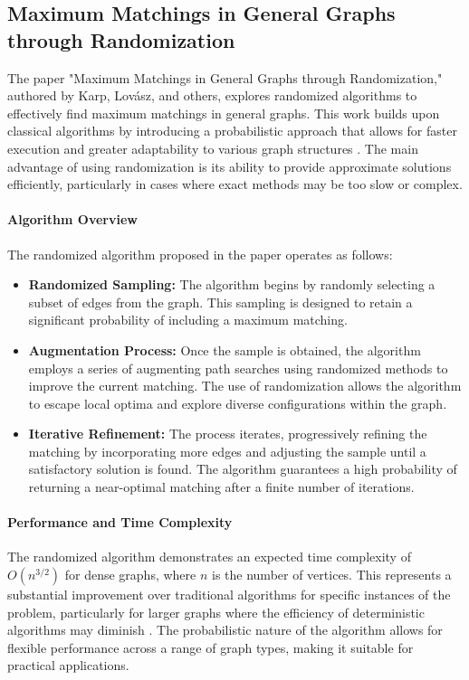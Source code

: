 \subsection*{Maximum Matchings in General Graphs through Randomization}

The paper "Maximum Matchings in General Graphs through Randomization," authored by Karp, Lovász, and others, explores randomized algorithms to effectively find maximum matchings in general graphs. This work builds upon classical algorithms by introducing a probabilistic approach that allows for faster execution and greater adaptability to various graph structures \cite{karp2011maximum}. The main advantage of using randomization is its ability to provide approximate solutions efficiently, particularly in cases where exact methods may be too slow or complex.

\paragraph{Algorithm Overview}
The randomized algorithm proposed in the paper operates as follows:
\begin{itemize}
    \item \textbf{Randomized Sampling:} The algorithm begins by randomly selecting a subset of edges from the graph. This sampling is designed to retain a significant probability of including a maximum matching.
    \item \textbf{Augmentation Process:} Once the sample is obtained, the algorithm employs a series of augmenting path searches using randomized methods to improve the current matching. The use of randomization allows the algorithm to escape local optima and explore diverse configurations within the graph.
    \item \textbf{Iterative Refinement:} The process iterates, progressively refining the matching by incorporating more edges and adjusting the sample until a satisfactory solution is found. The algorithm guarantees a high probability of returning a near-optimal matching after a finite number of iterations.
\end{itemize}

\paragraph{Performance and Time Complexity}
The randomized algorithm demonstrates an expected time complexity of \(O(n^{3/2})\) for dense graphs, where \(n\) is the number of vertices. This represents a substantial improvement over traditional algorithms for specific instances of the problem, particularly for larger graphs where the efficiency of deterministic algorithms may diminish \cite{karp2011maximum, lovasz2013randomized}. The probabilistic nature of the algorithm allows for flexible performance across a range of graph types, making it suitable for practical applications.

